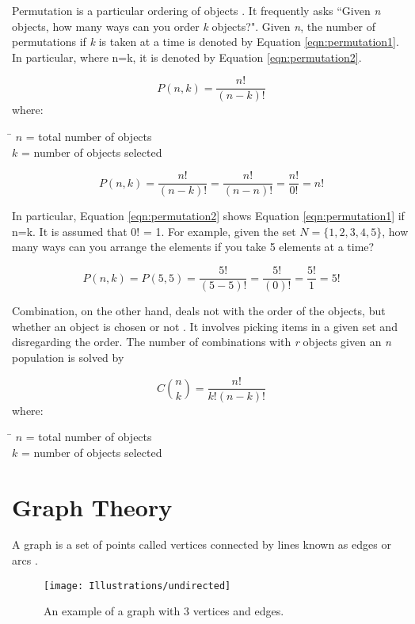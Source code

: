 {Permutation} is a particular ordering of objects \cite{combinatorics}. It frequently asks ``Given \emph{n} objects, how many ways can you order \emph{k} objects?". Given \emph{n}, the number of permutations if \emph{k} is taken at a time is denoted by Equation \ref{eqn:permutation1}. In particular, where n=k, it is denoted by Equation \ref{eqn:permutation2}. 

\begin{equation}
	\label{eqn:permutation1}
	P(n,k)= \frac{n!}{(n-k)!}
\end{equation}
where:
\begin{tabbing}
	\= \kill
	$n$\> = total number of objects\\
	$k$\> = number of objects selected\\
\end{tabbing}

\begin{equation}
	\label{eqn:permutation2}
	P(n,k)=\frac{n!}{(n-k)!}=\frac{n!}{(n-n)!}= \frac{n!}{0!} = n!
\end{equation}

\noindent In particular, Equation \ref{eqn:permutation2} shows Equation \ref{eqn:permutation1} if n=k. It is assumed that 0! = 1. For example, given the set $N= \{1,2,3,4,5\}$, how many ways can you arrange the elements if you take 5 elements at a time?
\hfill \par 
$$P(n,k)= P(5,5)=\frac{5!}{(5-5)!}=\frac{5!}{(0)!}= \frac{5!}{1}= 5!$$ \par 


{Combination}, on the other  hand, deals not with the order of the objects, but whether an object is chosen or not \cite{morris2017combinatorics}. It involves picking items in a given set and disregarding the order. The number of combinations with \emph{r} objects given an \emph{n} population is solved by

\begin{equation}
	\label{eqn:combination}
	C{n \choose k}  = \frac{n!}{k!(n-k)!}
\end{equation}
where:
\begin{tabbing}
	\= \kill
	$n$\> = total number of objects\\
	$k$\> = number of objects selected\\
\end{tabbing}

\section{Graph Theory}
 \indent \indent A graph is a set of points called vertices connected by lines known as edges or arcs \cite{graphtheory}.
\begin{figure}[H]
	\caption{An example of a graph with 3 vertices and edges.}
	\texttt{[image: Illustrations/undirected]}
	\centering
\end{figure}

